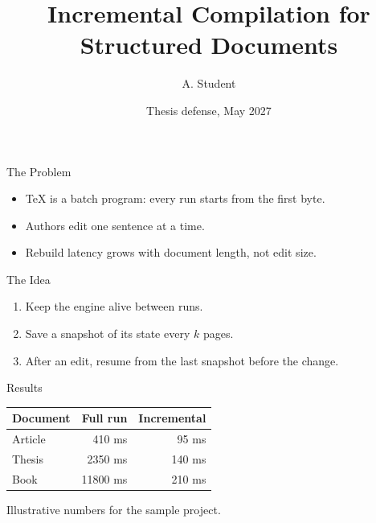 \documentclass[aspectratio=169]{beamer}
\title{Incremental Compilation for Structured Documents}
\author{A. Student}
\date{Thesis defense, May 2027}
\begin{document}
\begin{frame}
  \titlepage
\end{frame}

\begin{frame}{The Problem}
  \label{frame:problem}
  \begin{itemize}
    \item \TeX{} is a batch program: every run starts from the first byte.
    \item Authors edit one sentence at a time.
    \item Rebuild latency grows with document length, not edit size.
  \end{itemize}
\end{frame}

\begin{frame}{The Idea}
  \label{frame:idea}
  \begin{enumerate}
    \item Keep the engine alive between runs.
    \item Save a snapshot of its state every $k$ pages.
    \item After an edit, resume from the last snapshot before the change.
  \end{enumerate}
\end{frame}

\begin{frame}{Results}
  \label{frame:results}
  \centering
  \begin{tabular}{lrr}
    Document & Full run & Incremental \\
    \hline
    Article  &  410 ms &  95 ms \\
    Thesis   & 2350 ms & 140 ms \\
    Book     & 11800 ms & 210 ms \\
  \end{tabular}

  \medskip
  Illustrative numbers for the sample project.
\end{frame}
\end{document}
